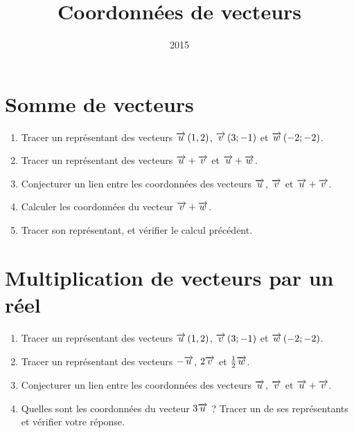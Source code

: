 \documentclass[12pt,169]{beamer}
\date{2015}
\title{Coordonnées de vecteurs}
\begin{document}
\section{Somme de vecteurs}
\begin{frame}
  \begin{center}
\end{center}

\begin{enumerate}
  \item Tracer un représentant des vecteurs $\overrightarrow{u}\left( 1,2 \right)$, $\overrightarrow{v}\left(3;-1 \right)$ et $\overrightarrow{w}\left( -2;-2 \right)$.
  \item Tracer un représentant des vecteurs $\overrightarrow{u}+\overrightarrow{v}$ et $\overrightarrow{u}+\overrightarrow{w}$.
  \item Conjecturer un lien entre les coordonnées des vecteurs $\overrightarrow{u}$, $\overrightarrow{v}$ et $\overrightarrow{u}+\overrightarrow{v}$.
  \item Calculer les coordonnées du vecteur $\overrightarrow{v}+\overrightarrow{w}$.
  \item Tracer son représentant, et vérifier le calcul précédent.
\end{enumerate}
\end{frame}

\section{Multiplication de vecteurs par un réel}
\begin{frame}
  \begin{center}
\end{center}

\begin{enumerate}
  \item Tracer un représentant des vecteurs $\overrightarrow{u}\left( 1,2 \right)$, $\overrightarrow{v}\left(3;-1 \right)$ et $\overrightarrow{w}\left( -2;-2 \right)$.
  \item Tracer un représentant des vecteurs $-\overrightarrow{u}$, $2\overrightarrow{v}$ et $\frac{1}{2}\overrightarrow{w}$.
  \item Conjecturer un lien entre les coordonnées des vecteurs $\overrightarrow{u}$, $\overrightarrow{v}$ et $\overrightarrow{u}+\overrightarrow{v}$.
  \item Quelles sont les coordonnées du vecteur $3\overrightarrow{u}$ ? Tracer un de ses représentants et vérifier votre réponse.
\end{enumerate}
\end{frame}
\end{document}

